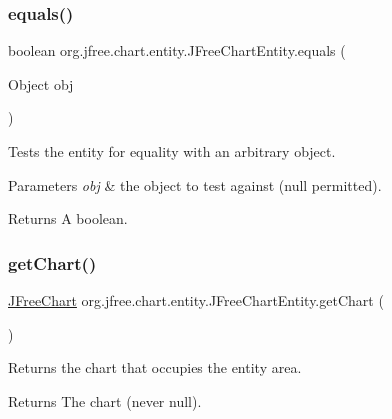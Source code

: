 \subsubsection{\texorpdfstring{equals()}{equals()}}
{\footnotesize\ttfamily boolean org.\+jfree.\+chart.\+entity.\+J\+Free\+Chart\+Entity.\+equals (\begin{DoxyParamCaption}\item[{Object}]{obj }\end{DoxyParamCaption})}

Tests the entity for equality with an arbitrary object.


\begin{DoxyParams}{Parameters}
{\em obj} & the object to test against ({\ttfamily null} permitted).\\
\hline
\end{DoxyParams}
\begin{DoxyReturn}{Returns}
A boolean. 
\end{DoxyReturn}
\mbox{\label{classorg_1_1jfree_1_1chart_1_1entity_1_1_j_free_chart_entity_a38a93753dc452286946d96658cf222d0}} 
\subsubsection{\texorpdfstring{get\+Chart()}{getChart()}}
{\footnotesize\ttfamily \mbox{\hyperlink{classorg_1_1jfree_1_1chart_1_1_j_free_chart}{J\+Free\+Chart}} org.\+jfree.\+chart.\+entity.\+J\+Free\+Chart\+Entity.\+get\+Chart (\begin{DoxyParamCaption}{ }\end{DoxyParamCaption})}

Returns the chart that occupies the entity area.

\begin{DoxyReturn}{Returns}
The chart (never {\ttfamily null}). 
\end{DoxyReturn}
\mbox{\label{classorg_1_1jfree_1_1chart_1_1entity_1_1_j_free_chart_entity_a7d6627e13ea6a9e183944e9a5911e0d9}} 
